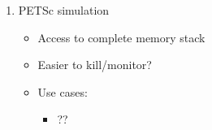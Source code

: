 \documentclass{article}
\begin{document}
\begin{enumerate}
\begin{itemize}
\begin{itemize}
          \item ??
        \end{itemize}
    \end{itemize}
  \item PETSc simulation 
    \begin{itemize}
      \item Access to complete memory stack
      \item Easier to kill/monitor?
      \item Use cases: 
        \begin{itemize}
          \item ??
        \end{itemize}
    \end{itemize}
\end{enumerate}


\clearpage
\end{document}
